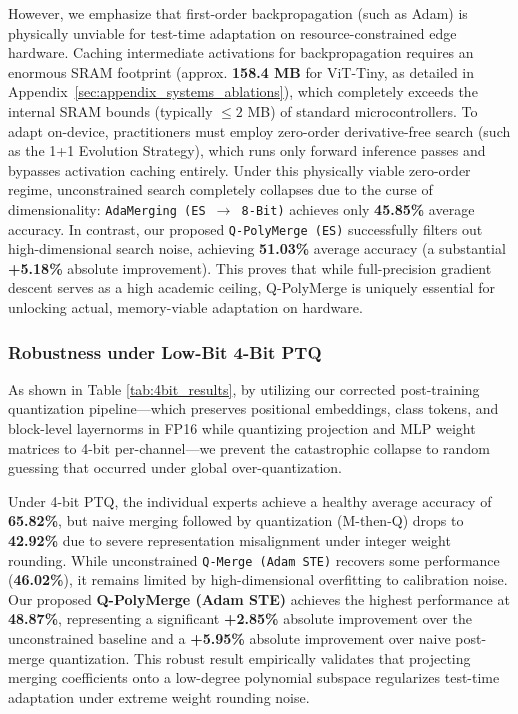 However, we emphasize that first-order backpropagation (such as Adam) is physically unviable for test-time adaptation on resource-constrained edge hardware. Caching intermediate activations for backpropagation requires an enormous SRAM footprint (approx. \textbf{158.4 MB} for ViT-Tiny, as detailed in Appendix~\ref{sec:appendix_systems_ablations}), which completely exceeds the internal SRAM bounds (typically $\le 2$ MB) of standard microcontrollers. To adapt on-device, practitioners must employ zero-order derivative-free search (such as the 1+1 Evolution Strategy), which runs only forward inference passes and bypasses activation caching entirely. Under this physically viable zero-order regime, unconstrained search completely collapses due to the curse of dimensionality: \texttt{AdaMerging (ES $\to$ 8-Bit)} achieves only \textbf{45.85\%} average accuracy. In contrast, our proposed \texttt{Q-PolyMerge (ES)} successfully filters out high-dimensional search noise, achieving \textbf{51.03\%} average accuracy (a substantial \textbf{+5.18\%} absolute improvement). This proves that while full-precision gradient descent serves as a high academic ceiling, Q-PolyMerge is uniquely essential for unlocking actual, memory-viable adaptation on hardware.

\subsubsection{Robustness under Low-Bit 4-Bit PTQ}
As shown in Table \ref{tab:4bit_results}, by utilizing our corrected post-training quantization pipeline—which preserves positional embeddings, class tokens, and block-level layernorms in FP16 while quantizing projection and MLP weight matrices to 4-bit per-channel—we prevent the catastrophic collapse to random guessing that occurred under global over-quantization. 

Under 4-bit PTQ, the individual experts achieve a healthy average accuracy of \textbf{65.82\%}, but naive merging followed by quantization (M-then-Q) drops to \textbf{42.92\%} due to severe representation misalignment under integer weight rounding. While unconstrained \texttt{Q-Merge (Adam STE)} recovers some performance (\textbf{46.02\%}), it remains limited by high-dimensional overfitting to calibration noise. Our proposed \textbf{Q-PolyMerge (Adam STE)} achieves the highest performance at \textbf{48.87\%}, representing a significant \textbf{+2.85\%} absolute improvement over the unconstrained baseline and a \textbf{+5.95\%} absolute improvement over naive post-merge quantization. This robust result empirically validates that projecting merging coefficients onto a low-degree polynomial subspace regularizes test-time adaptation under extreme weight rounding noise.

